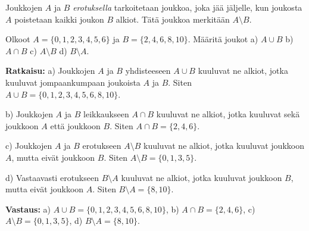 

Joukkojen $A$ ja $B$ {\em erotuksella} tarkoitetaan joukkoa, joka jää jäljelle, kun joukosta $A$ poistetaan kaikki joukon $B$ alkiot. Tätä joukkoa merkitään $A\setminus B$. 

\begin{center}


\end{center}


\begin{esimerkki}
Olkoot $A = \{0, 1, 2, 3, 4, 5, 6\}$ ja $B = \{2, 4, 6, 8, 10\}$. Määritä joukot a) $A\cup B$ b) $A \cap B$ c) $A\setminus B$ d) $B \setminus A$.

{\bf Ratkaisu:} 
a) Joukkojen $A$ ja $B$ yhdisteeseen $A \cup B$ kuuluvat ne alkiot, jotka kuuluvat jompaankumpaan joukoista $A$ ja $B$. Siten $A\cup B = \{0, 1, 2, 3, 4, 5, 6, 8, 10\}$.

b) Joukkojen $A$ ja $B$ leikkaukseen $A \cap B$ kuuluvat ne alkiot, jotka kuuluvat sekä joukkoon $A$ että joukkoon $B$. Siten $A \cap B = \{2, 4, 6\}$.

c) Joukkojen $A$ ja $B$ erotukseen $A \setminus B$ kuuluvat ne alkiot, jotka kuuluvat joukkoon $A$, mutta eivät joukkoon $B$. Siten $A \setminus B = \{0, 1, 3, 5\}$.

d) Vastaavasti erotukseen $B \setminus A$ kuuluvat ne alkiot, jotka kuuluvat joukkoon $B$, mutta eivät joukkoon $A$. Siten $B \setminus A = \{8, 10\}$.

{\bf Vastaus:} a) $A \cup B = \{0, 1, 2, 3, 4, 5, 6, 8, 10\}$,  b) $A \cap B = \{2, 4, 6\}$,  c) $A \setminus B = \{0, 1, 3,5\}$,  d) $B \setminus A = \{8, 10\}$.
\end{esimerkki}


